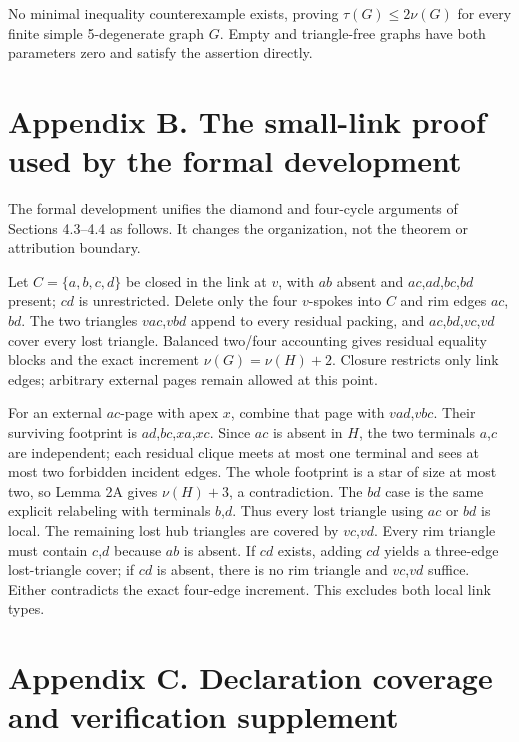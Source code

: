 \documentclass[11pt]{article}
\begin{document}
No minimal inequality counterexample exists, proving
\(\tau(G)\le 2\nu(G)\) for every finite simple 5-degenerate graph \(G\).
Empty and triangle-free graphs have both parameters zero and satisfy the
assertion directly.

\section{Appendix B. The small-link proof used by the formal
development}\label{appendix-b.-the-small-link-proof-used-by-the-formal-development}

The formal development unifies the diamond and four-cycle arguments of
Sections 4.3--4.4 as follows. It changes the organization, not the
theorem or attribution boundary.

Let \(C=\{a,b,c,d\}\) be closed in the link at \(v\), with \(ab\) absent
and \(ac\),\(ad\),\(bc\),\(bd\) present; \(cd\) is unrestricted. Delete
only the four \(v\)-spokes into \(C\) and rim edges \(ac\),\(bd\). The
two triangles \(vac\),\(vbd\) append to every residual packing, and
\(ac\),\(bd\),\(vc\),\(vd\) cover every lost triangle. Balanced two/four
accounting gives residual equality blocks and the exact increment
\(\nu(G)=\nu(H)+2\). Closure restricts only link edges; arbitrary
external pages remain allowed at this point.

For an external \(ac\)-page with apex \(x\), combine that page with
\(vad\),\(vbc\). Their surviving footprint is
\(ad\),\(bc\),\(xa\),\(xc\). Since \(ac\) is absent in \(H\), the two
terminals \(a\),\(c\) are independent; each residual clique meets at
most one terminal and sees at most two forbidden incident edges. The
whole footprint is a star of size at most two, so Lemma 2A gives
\(\nu(H)+3\), a contradiction. The \(bd\) case is the same explicit
relabeling with terminals \(b\),\(d\). Thus every lost triangle using
\(ac\) or \(bd\) is local. The remaining lost hub triangles are covered
by \(vc\),\(vd\). Every rim triangle must contain \(c\),\(d\) because
\(ab\) is absent. If \(cd\) exists, adding \(cd\) yields a three-edge
lost-triangle cover; if \(cd\) is absent, there is no rim triangle and
\(vc\),\(vd\) suffice. Either contradicts the exact four-edge increment.
This excludes both local link types.

\clearpage
\section{Appendix C. Declaration coverage and verification
supplement}\label{appendix-c.-declaration-coverage-and-verification-supplement}
\end{document}

